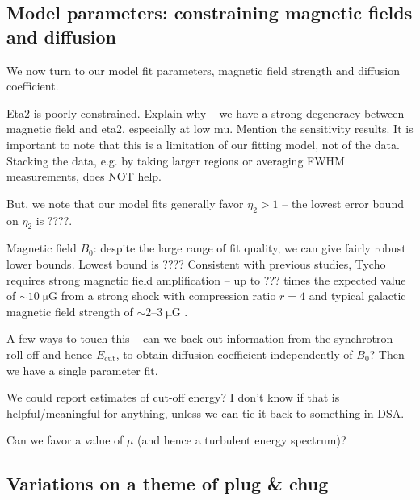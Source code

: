 \documentclass[iop, apj, numberedappendix, twocolappendix]{emulateapj}
\newcommand*{\mt}{\mathrm}
\newcommand*{\unit}[1]{\;\mt{#1}}  %
\newcommand*{\abt}{\mathord{\sim}} %
\newcommand*{\Ecut}{E_{\mt{cut}}}
\begin{document}
\subsection{Model parameters: constraining magnetic fields and diffusion}

We now turn to our model fit parameters, magnetic field strength and diffusion
coefficient.


Eta2 is poorly constrained.  Explain why -- we have a strong degeneracy between
magnetic field and eta2, especially at low mu.  Mention the sensitivity
results.
It is important to note that this is a limitation of our fitting model, not of
the data.  Stacking the data, e.g. by taking larger regions or averaging FWHM
measurements, does NOT help.

But, we note that our model fits generally favor $\eta_2 > 1$ -- the lowest
error bound on $\eta_2$ is ????. %

Magnetic field $B_0$: despite the large range of fit quality, we can give
fairly robust lower bounds.  Lowest bound is ????  Consistent with previous
studies, Tycho requires strong magnetic field amplification -- up to ??? times
the expected value of $\abt 10 \unit{\mu G}$ from a strong shock with
compression ratio $r=4$ and typical galactic magnetic field strength of $\abt
2$--$3 \unit{\mu G}$ \citep{lyne1989, han2006}.

A few ways to touch this -- can we back out information from the synchrotron
roll-off and hence $\Ecut$, to obtain diffusion coefficient independently of
$B_0$?  Then we have a single parameter fit.

We could report estimates of cut-off energy?  I don't know if that is
helpful/meaningful for anything, unless we can tie it back to something in DSA.

Can we favor a value of $\mu$ (and hence a turbulent energy spectrum)?


\subsection{Variations on a theme of plug \& chug}
\end{document}
